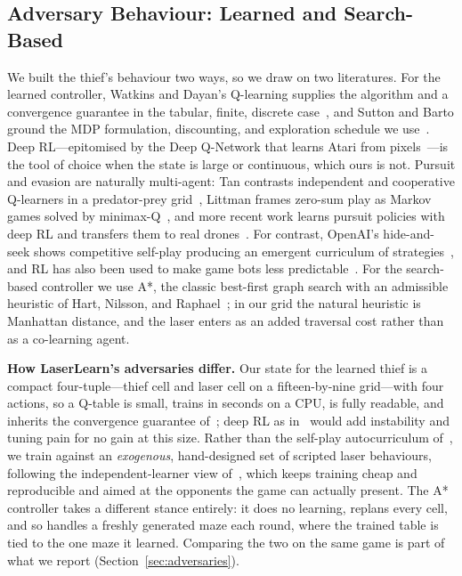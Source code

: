 \documentclass[conference]{IEEEtran}
\begin{document}
\subsection{Adversary Behaviour: Learned and Search-Based}
We built the thief's behaviour two ways, so we draw on two literatures. For the
learned controller, Watkins and Dayan's Q-learning supplies the algorithm and a
convergence guarantee in the tabular, finite, discrete case~\cite{watkins1992},
and Sutton and Barto ground the MDP formulation, discounting, and exploration
schedule we use~\cite{sutton2018}. Deep RL---epitomised by the Deep Q-Network that
learns Atari from pixels~\cite{mnih2015}---is the tool of choice when the state is
large or continuous, which ours is not. Pursuit and evasion are naturally
multi-agent: Tan contrasts independent and cooperative Q-learners in a
predator-prey grid~\cite{tan1993}, Littman frames zero-sum play as Markov games
solved by minimax-Q~\cite{littman1994}, and more recent work learns pursuit
policies with deep RL and transfers them to real drones~\cite{desouza2021}. For
contrast, OpenAI's hide-and-seek shows competitive self-play producing an emergent
curriculum of strategies~\cite{baker2020}, and RL has also been used to make game
bots less predictable~\cite{glavin2015}. For the search-based controller we use
A*, the classic best-first graph search with an admissible heuristic of Hart,
Nilsson, and Raphael~\cite{hart1968}; in our grid the natural heuristic is
Manhattan distance, and the laser enters as an added traversal cost rather than as
a co-learning agent.

\textbf{How LaserLearn's adversaries differ.} Our state for the learned thief is a
compact four-tuple---thief cell and laser cell on a fifteen-by-nine grid---with
four actions, so a Q-table is small, trains in seconds on a CPU, is fully
readable, and inherits the convergence guarantee of~\cite{watkins1992}; deep RL as
in~\cite{mnih2015,desouza2021} would add instability and tuning pain for no gain at
this size. Rather than the self-play autocurriculum of~\cite{baker2020}, we train
against an \emph{exogenous}, hand-designed set of scripted laser behaviours,
following the independent-learner view of~\cite{tan1993}, which keeps training
cheap and reproducible and aimed at the opponents the game can actually present.
The A* controller takes a different stance entirely: it does no learning, replans
every cell, and so handles a freshly generated maze each round, where the trained
table is tied to the one maze it learned. Comparing the two on the same game is
part of what we report (Section~\ref{sec:adversaries}).
\end{document}
